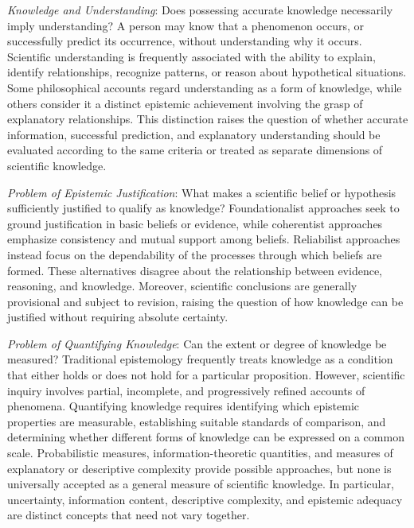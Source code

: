 \emph{Knowledge and Understanding}: Does possessing accurate knowledge necessarily imply understanding? A person may know that a phenomenon occurs, or successfully predict its occurrence, without understanding why it occurs. Scientific understanding is frequently associated with the ability to explain, identify relationships, recognize patterns, or reason about hypothetical situations. Some philosophical accounts regard understanding as a form of knowledge, while others consider it a distinct epistemic achievement involving the grasp of explanatory relationships. This distinction raises the question of whether accurate information, successful prediction, and explanatory understanding should be evaluated according to the same criteria or treated as separate dimensions of scientific knowledge.

\emph{Problem of Epistemic Justification}: What makes a scientific belief or hypothesis sufficiently justified to qualify as knowledge? Foundationalist approaches seek to ground justification in basic beliefs or evidence, while coherentist approaches emphasize consistency and mutual support among beliefs. Reliabilist approaches instead focus on the dependability of the processes through which beliefs are formed. These alternatives disagree about the relationship between evidence, reasoning, and knowledge. Moreover, scientific conclusions are generally provisional and subject to revision, raising the question of how knowledge can be justified without requiring absolute certainty.

\emph{Problem of Quantifying Knowledge}: Can the extent or degree of knowledge be measured? Traditional epistemology frequently treats knowledge as a condition that either holds or does not hold for a particular proposition. However, scientific inquiry involves partial, incomplete, and progressively refined accounts of phenomena. Quantifying knowledge requires identifying which epistemic properties are measurable, establishing suitable standards of comparison, and determining whether different forms of knowledge can be expressed on a common scale. Probabilistic measures, information-theoretic quantities, and measures of explanatory or descriptive complexity provide possible approaches, but none is universally accepted as a general measure of scientific knowledge. In particular, uncertainty, information content, descriptive complexity, and epistemic adequacy are distinct concepts that need not vary together.

